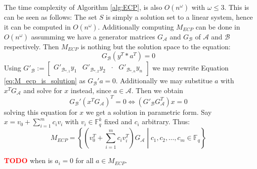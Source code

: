 \begin{remark}
  The time complexity of Algorithm \ref{alg:ECP}, is also $O(n^{\omega})$ with $\omega \leq 3$. This is can be seen as follows: The set $S$ is simply a solution set to a linear system, hence it can be computed in $O(n^{\omega})$. Additionally computing $M_{ECP}$ can be done in $O(n^{\omega})$ assumming we have a generator matrices $G_\mathcal{A}$ and $G_\mathcal{B}$ of $\mathcal{A}$ and $\mathcal{B}$ respectively. Then $M_{ECP}$ is nothing but the solution space to the equation:
  \begin{equation}\label{eq:M_ecp_is_solution}
    G_\mathcal{B} (y^{T} * a^{T}) = 0
  \end{equation}
  Using $G'_\mathcal{B} := \begin{bmatrix} G'_{\mathcal{B}_{*, 1}}y_1 & G'_{\mathcal{B}_{*, 2}}y_2 & \cdot & G'_{\mathcal{B}_{*, n}} y_{n}\end{bmatrix}$ we may rewrite Equation \eqref{eq:M_ecp_is_solution} as $G_\mathcal{B}' a = 0$. Additionally we may substitue $a$ with $x^T G_\mathcal{A}$ and solve for $x$ instead, since $a \in \mathcal{A}$. Then we obtain
  \begin{equation*}
    G_\mathcal{B}' (x^T G_\mathcal{A})^T = 0 \iff (G'_\mathcal{B} G_\mathcal{A}^T) x = 0
  \end{equation*}
  solving this equation for $x$ we get a solution in parametric form. Say $x = v_{0} + \sum_{i = 1}^m c_i v_{i}$ with $v_i \in \mathbb{F}_q^k$ fixed and $c_i$ arbitrary. Thus:
  \begin{equation}\label{eq:form_of_a}
    M_{ECP} = \left\{\left(v_0^{T} + \sum_{i = 1}^m c_i v_i^{T}\right) G_\mathcal{A} \middle| c_1, c_2, \ldots, c_{m} \in \mathbb{F}_q \right\}
  \end{equation}

  \textcolor{red}{\textbf{TODO}} when is $a_i = 0$ for all $a \in M_{ECP}$.

\end{remark}

